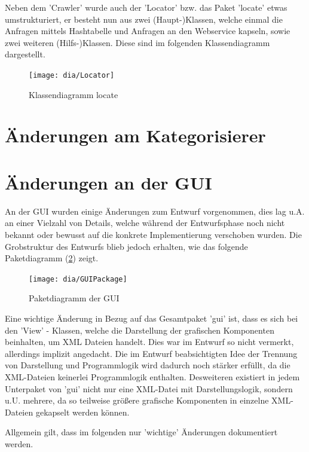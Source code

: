 Neben dem 'Crawler' wurde auch der 'Locator' bzw. das Paket 'locate' etwas umstrukturiert, er besteht nun aus zwei (Haupt-)Klassen, welche einmal die Anfragen mittels Hashtabelle und  Anfragen an den Webservice kapseln, sowie zwei weiteren (Hilfs-)Klassen. Diese sind im folgenden Klassendiagramm dargestellt.
 \begin{figure}[h!]
 	\centering
 	\texttt{[image: dia/Locator]}
 	\caption{Klassendiagramm locate}
 	\label{fig:locate}
 \end{figure}

 

\section{Änderungen am Kategorisierer}

\section{Änderungen an der GUI}
 An der GUI wurden einige Änderungen zum Entwurf vorgenommen, dies lag u.A. an einer Vielzahl von Details, welche während der Entwurfsphase noch nicht bekannt oder bewusst auf die konkrete Implementierung verschoben wurden. 
Die Grobstruktur des Entwurfs blieb jedoch erhalten, wie das folgende Paketdiagramm (\ref{fig:GUI}) zeigt.
\begin{figure}[h!]
	\centering
	\texttt{[image: dia/GUIPackage]}
	\caption{Paketdiagramm der GUI}
	\label{fig:GUI}
\end{figure}
	Eine wichtige Änderung in Bezug auf das Gesamtpaket 'gui' ist, dass es sich bei den 'View' - Klassen, welche die Darstellung der grafischen Komponenten beinhalten, um XML Dateien handelt. Dies war im Entwurf so nicht vermerkt, allerdings implizit angedacht. Die  im Entwurf beabsichtigten Idee der Trennung von Darstellung und Programmlogik wird dadurch noch stärker erfüllt, da die XML-Dateien keinerlei Programmlogik enthalten. Desweiteren existiert in jedem Unterpaket von 'gui' nicht nur eine XML-Datei mit Darstellungslogik, sondern u.U. mehrere, da so teilweise größere grafische Komponenten in einzelne XML-Dateien gekapselt werden können.
	
	Allgemein gilt, dass im folgenden nur 'wichtige' Änderungen dokumentiert werden.
